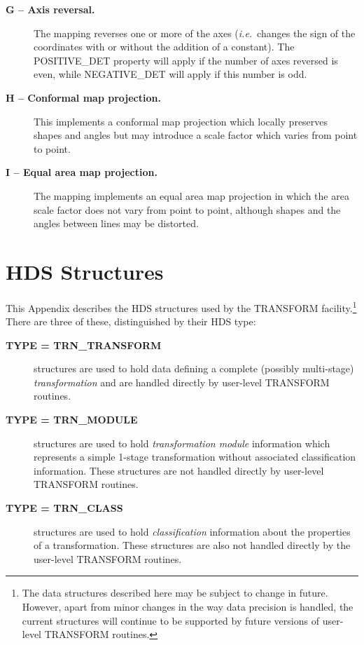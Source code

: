 \documentclass[twoside,nolof,11pt]{starlink}
\providecommand{\name}[1]{\small{#1}}
\begin{document}
\begin{description}
\item[\textbf{G -- Axis reversal.}] The mapping reverses one or more of the
axes (\emph{i.e.}\ changes the sign of the coordinates with or without the
addition of a constant).
The \name{POSITIVE\_DET} property will apply if the number of axes reversed
is even, while \name{NEGATIVE\_DET} will apply if this number is odd.

\item[\textbf{H -- Conformal map projection.}] This implements a
conformal map projection which locally preserves shapes and angles but may
introduce a scale factor which varies from point to point.

\item[\textbf{I -- Equal area map projection.}] The mapping implements an
equal area map projection in which the area scale factor does not vary from
point to point, although shapes and the angles between lines may be
distorted.

\end{description}

\newpage
\section{HDS Structures}

\label{appendix_structures}

This Appendix describes the \name{HDS} structures used by the
\name{TRANSFORM} facility.\footnote{
The data structures described here may be subject to change in future.
However, apart from minor changes in the way data precision is handled, the
current structures will continue to be supported by future versions of
user-level \name{TRANSFORM} routines.
}
There are three of these, distinguished by their HDS type:

\begin{description}

\item[\textbf{TYPE = \name{TRN\_TRANSFORM}}] structures are used to hold data
defining a complete (possibly multi-stage) \emph{transformation} and are
handled directly by user-level \name{TRANSFORM} routines.

\item[\textbf{TYPE = \name{TRN\_MODULE}}] structures are used to hold
\emph{transformation module} information which represents a simple 1-stage
transformation without associated classification information.
These structures are not handled directly by user-level \name{TRANSFORM}
routines.

\item[\textbf{TYPE = \name{TRN\_CLASS}}] structures are used to hold
\emph{classification} information about the properties of a transformation.
These structures are also not handled directly by the user-level
\name{TRANSFORM} routines.

\end{description}
\end{document}
